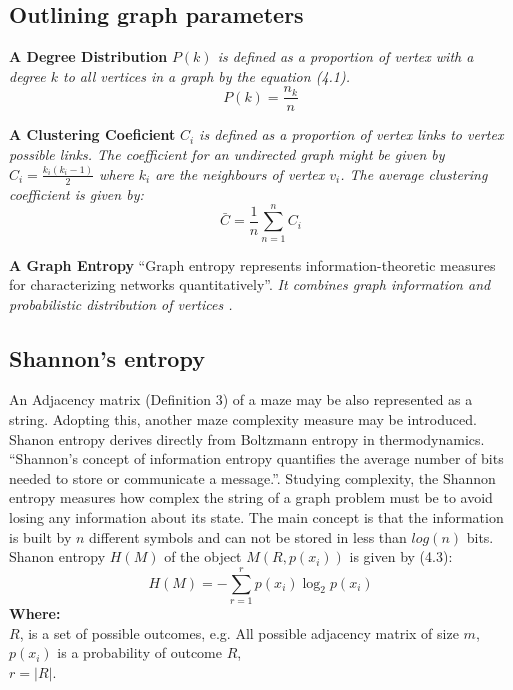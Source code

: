 \subsection{Outlining graph parameters}
\begin{definition}\textbf{A Degree Distribution} \emph{$P(k)$ is defined as a proportion of vertex with a degree $k$ to all vertices in a graph by the equation (4.1).}
\begin{equation}
P(k) = \frac{n_k}{n}
\end{equation}
\end{definition}
\begin{definition}\textbf{A Clustering Coeficient} \emph{$C_i$ is defined as a proportion of vertex links to vertex possible links. The coefficient for an undirected graph might be given by $C_i = \frac{k_i(k_i-1)}{2}$ where $k_i$ are the neighbours of vertex $v_i$. The average clustering coefficient is given by:}
\begin{equation}
\bar{C} = \frac{1}{n}\sum_{n = 1}^{n} C_i
\end{equation}
\end{definition}
\begin{definition}\textbf{A Graph Entropy} “Graph entropy represents information-theoretic measures for characterizing networks quantitatively”\cite{12}.
\emph{It combines graph information and probabilistic distribution of vertices \cite{13}.}\end{definition}
\subsection{Shannon's entropy}
An Adjacency matrix (Definition 3) of a maze may be also represented as a string. Adopting this, another maze complexity measure may be introduced.
Shanon entropy derives directly from Boltzmann entropy in thermodynamics. “Shannon’s concept of information entropy quantifies the average number of bits needed to store or communicate a message.”\cite{11}. Studying complexity, the Shannon entropy measures how complex the string of a graph problem must be to avoid losing any information about its state. The main concept is that the information is built by $n$ different symbols and can not be stored in less than $log(n)$ bits.
Shanon entropy $H(M)$ of the object $M(R, p(x_i))$ is given by (4.3)\cite{11}:
\begin{equation}
H(M) = - \sum_{r = 1}^{r} p(x_i)\log_2 p(x_i)
\end{equation}
\textbf{Where:}\\
$R$, is a set of possible outcomes, e.g.  All possible adjacency matrix of size $m$,\\
$p(x_i)$ is a probability of outcome $R$,\\
$r= |R|$.\\
